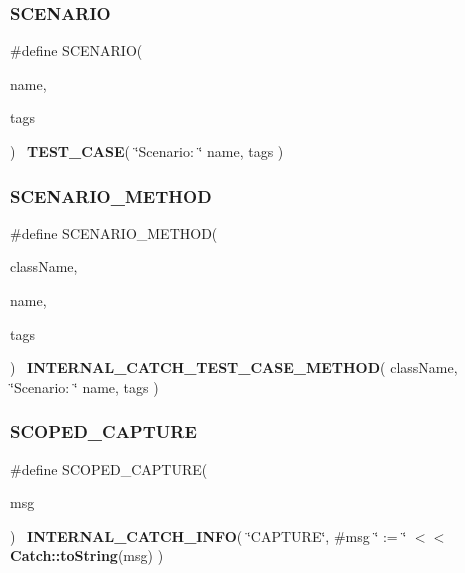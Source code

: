 \subsubsection{S\+C\+E\+N\+A\+R\+IO}
{\footnotesize\ttfamily \#define S\+C\+E\+N\+A\+R\+IO(\begin{DoxyParamCaption}\item[{}]{name,  }\item[{}]{tags }\end{DoxyParamCaption})~\textbf{ T\+E\+S\+T\+\_\+\+C\+A\+SE}( \char`\"{}Scenario\+: \char`\"{} name, tags )}

\mbox{\label{catch_8hpp_af3463f70ca99312394bb2850802e7fb3}} 
\subsubsection{S\+C\+E\+N\+A\+R\+I\+O\+\_\+\+M\+E\+T\+H\+OD}
{\footnotesize\ttfamily \#define S\+C\+E\+N\+A\+R\+I\+O\+\_\+\+M\+E\+T\+H\+OD(\begin{DoxyParamCaption}\item[{}]{class\+Name,  }\item[{}]{name,  }\item[{}]{tags }\end{DoxyParamCaption})~\textbf{ I\+N\+T\+E\+R\+N\+A\+L\+\_\+\+C\+A\+T\+C\+H\+\_\+\+T\+E\+S\+T\+\_\+\+C\+A\+S\+E\+\_\+\+M\+E\+T\+H\+OD}( class\+Name, \char`\"{}Scenario\+: \char`\"{} name, tags )}

\mbox{\label{catch_8hpp_ac0f6898b30b544cafa4f575aa5df2499}} 
\subsubsection{S\+C\+O\+P\+E\+D\+\_\+\+C\+A\+P\+T\+U\+RE}
{\footnotesize\ttfamily \#define S\+C\+O\+P\+E\+D\+\_\+\+C\+A\+P\+T\+U\+RE(\begin{DoxyParamCaption}\item[{}]{msg }\end{DoxyParamCaption})~\textbf{ I\+N\+T\+E\+R\+N\+A\+L\+\_\+\+C\+A\+T\+C\+H\+\_\+\+I\+N\+FO}( \char`\"{}C\+A\+P\+T\+U\+RE\char`\"{}, \#msg \char`\"{} \+:= \char`\"{} $<$$<$ \textbf{ Catch\+::to\+String}(msg) )}

